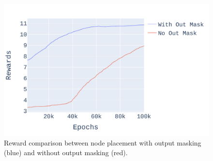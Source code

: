\begin{figure}[h]
  \centering
  \includegraphics[width=\linewidth]{fig/ifft_masked_nomask.pdf}
  \caption{Reward comparison between node placement with output masking (blue) and without output masking (red).}
  \label{fig:mask_nomask}
\end{figure}




